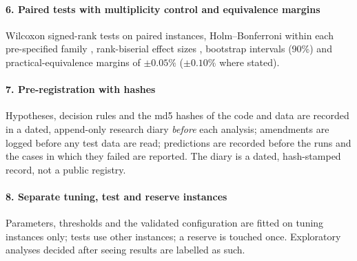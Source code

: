 \paragraph{6. Paired tests with multiplicity control and equivalence margins}
Wilcoxon signed-rank tests on paired instances, Holm--Bonferroni within each pre-specified family \citep{Wilcoxon1945,Holm1979,DerracEtal2011}, rank-biserial effect sizes
\citep{Kerby2014}, bootstrap intervals (90\%) and practical-equivalence margins of $\pm0.05\%$ ($\pm0.10\%$ where stated).

\paragraph{7. Pre-registration with hashes}
Hypotheses, decision rules and the md5 hashes of the code and data are recorded in a dated, append-only research diary \emph{before} each analysis; amendments are logged before any test data are
read; predictions are recorded before the runs and the cases in which they failed are reported. The diary is a dated, hash-stamped record, not a public registry.

\paragraph{8. Separate tuning, test and reserve instances}
Parameters, thresholds and the validated configuration are fitted on tuning instances only; tests use other instances; a reserve is touched once. Exploratory analyses decided after seeing results are
labelled as such.
